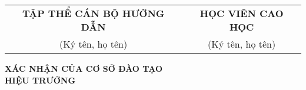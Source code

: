 \begin{center}
    \begin{tabular}{c c}
        \textbf{TẬP THỂ CÁN BỘ HƯỚNG DẪN} & \textbf{HỌC VIÊN CAO HỌC} \\
        (Ký tên, họ tên) & (Ký tên, họ tên) \\
    \end{tabular}
    
    \vspace{3cm} %
    
    \textbf{XÁC NHẬN CỦA CƠ SỞ ĐÀO TẠO} \\
    \textbf{HIỆU TRƯỞNG}
\end{center}
